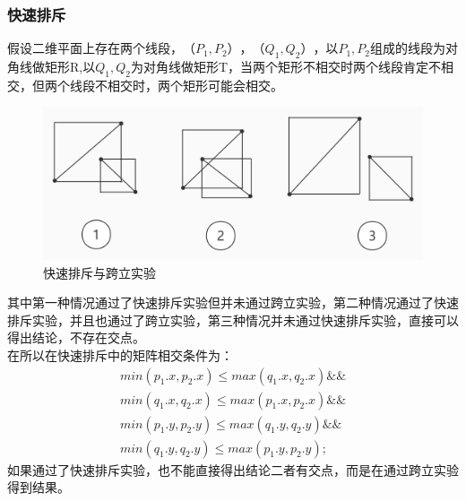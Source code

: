 \subsubsection{快速排斥}
假设二维平面上存在两个线段，$（P_1,P_2），（Q_1,Q_2）$，以$P_1,P_2$组成的线段为对角线做矩形R,以$Q_1,Q_2$为对角线做矩形T，当两个矩形不相交时两个线段肯定不相交，但两个线段不相交时，两个矩形可能会相交。
\begin{figure}[H]
    \centering
    \includegraphics[width=13cm]{figure/jdsy.jpg}%
    \caption{快速排斥与跨立实验}
    \label{fig:jdsy}
\end{figure}
其中第一种情况通过了快速排斥实验但并未通过跨立实验，第二种情况通过了快速排斥实验，并且也通过了跨立实验，第三种情况并未通过快速排斥实验，直接可以得出结论，不存在交点。\\
在所以在快速排斥中的矩阵相交条件为：
\begin{align}
    min(p_1.x,p_2.x) \le max(q_1.x,q_2.x) \&\& \\
    min(q_1.x,q_2.x) \le max(p_1.x,p_2.x) \&\& \\
    min(p_1.y,p_2.y) \le max(q_1.y,q_2.y) \&\& \\
    min(q_1.y,q_2.y) \le max(p_1.y,p_2.y);
\end{align}
如果通过了快速排斥实验，也不能直接得出结论二者有交点，而是在通过跨立实验得到结果。
